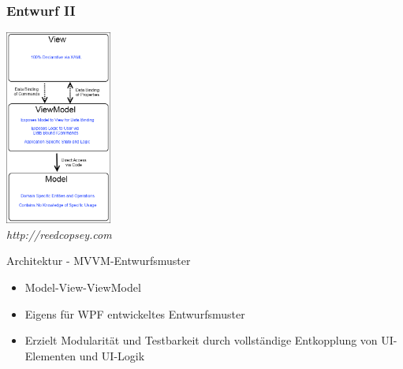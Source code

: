 \documentclass[t]{beamer}
\begin{document}
\begin{frame}
	\frametitle{Entwurf II}
	\noindent
	\begin{minipage}{3.5cm}
	    \includegraphics[width=3.5cm]{MVVM_thumb.png} ~\\
	    \textit{http://reedcopsey.com}
	\end{minipage}
	\hfill
	\begin{minipage}{8cm}
		Architektur - MVVM-Entwurfsmuster ~\\
	    \begin{itemize}	    
	    	\item<+-> Model-View-ViewModel
	        \item<+-> Eigens für WPF entwickeltes Entwurfsmuster
	        \item<+-> Erzielt Modularität und Testbarkeit durch vollständige Entkopplung von UI-Elementen und UI-Logik
	    \end{itemize}
	\end{minipage}
\end{frame}
\end{document}
